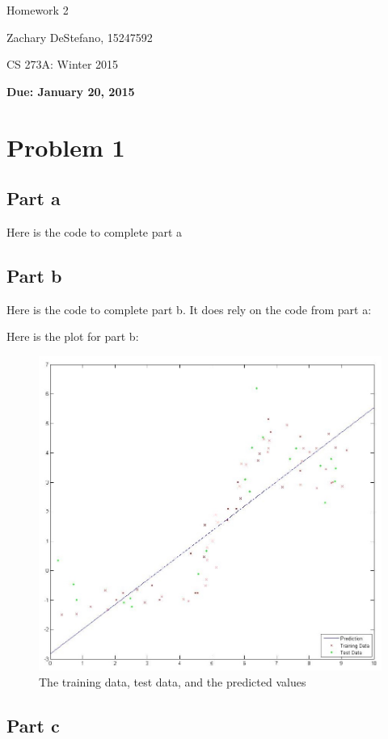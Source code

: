 \documentclass[twoside,11pt]{article}
\theoremstyle{definition}
\begin{document}
\centerline{\Large Homework 2}
\centerline{Zachary DeStefano, 15247592}
\centerline{CS 273A: Winter 2015}
\centerline{\bf Due: January 20, 2015}

\section*{Problem 1}

\subsection*{Part a}

Here is the code to complete part a


\subsection*{Part b}

Here is the code to complete part b. It does rely on the code from part a:


Here is the plot for part b:
\begin{figure}[H]
\centering
\includegraphics[width=\columnwidth]{prob1bPlot.jpg}
\caption{The training data, test data, and the predicted values}
\end{figure}

\subsection*{Part c}
\end{document}
